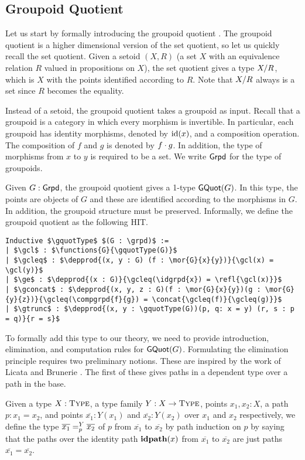 \subsection{Groupoid Quotient}
Let us start by formally introducing the groupoid quotient \cite{sojakovaPhD}.
The groupoid quotient is a higher dimensional version of the set quotient,
so let us quickly recall the set quotient.
Given a setoid $(X,R)$ (a set $X$ with an equivalence relation $R$ valued in propositions on $X$),
the set quotient gives a type $\quot{X}{R}$, which is $X$ with the points identified according to $R$.
Note that $\quot{X}{R}$ always is a set since $R$ becomes the equality.

Instead of a setoid, the groupoid quotient takes a groupoid as input.
Recall that a groupoid is a category in which every morphism is invertible.
In particular, each groupoid has identity morphisms, denoted by $\idgrpd{x}$, and a composition operation.
The composition of $f$ and $g$ is denoted by $\compgrpd{f}{g}$.
In addition, the type of morphisms from $x$ to $y$ is required to be a set.
We write $\grpd$ for the type of groupoids.

Given $G : \grpd$, the groupoid quotient gives a 1-type $\gquotType(G)$.
In this type, the points are objects of $G$
and these are identified according to the morphisms in $G$.
In addition, the groupoid structure must be preserved.
Informally, we define the groupoid quotient as the following HIT.

\begin{lstlisting}[mathescape=true]
Inductive $\gquotType$ $(G : \grpd)$ :=
| $\gcl$ : $\functions{G}{\gquotType(G)}$
| $\gcleq$ : $\depprod{(x, y : G) (f : \mor{G}{x}{y})}{\gcl(x) = \gcl(y)}$
| $\ge$ : $\depprod{(x : G)}{\gcleq(\idgrpd{x}) = \refl{\gcl(x)}}$
| $\gconcat$ : $\depprod{(x, y, z : G)(f : \mor{G}{x}{y})(g : \mor{G}{y}{z})}{\gcleq(\compgrpd{f}{g}) = \concat{\gcleq(f)}{\gcleq(g)}}$
| $\gtrunc$ : $\depprod{(x, y : \gquotType(G))(p, q: x = y) (r, s : p = q)}{r = s}$
\end{lstlisting}

To formally add this type to our theory, we need to provide
introduction, elimination, and computation rules for $\gquotType(G)$.
Formulating the elimination principle requires two preliminary notions.
These are inspired by the work of Licata and Brunerie \cite{licata2015cubical}.
The first of these gives paths in a dependent type over a path in the base.

\begin{definition}
\label{def:path_over}
Given a type $X : \Type$,
a type family $Y : \functions{X}{\Type}$,
points $x_1, x_2 : X$,
a path $p : x_1 = x_2$,
and points $\overline{x_1} : Y(x_1)$ and $\overline{x_2} : Y(x_2)$ over $x_1$ and $x_2$ respectively,
we define the type $\pathover[Y]{p}{\overline{x_1}}{\overline{x_2}}$ of  $p$ from $\overline{x_1}$ to $\overline{x_2}$ by path induction on $p$
by saying that the paths over the identity path $\refl{x}$ from $\overline{x_1}$ to $\overline{x_2}$ are just paths $\overline{x_1} = \overline{x_2}$.
\end{definition}

